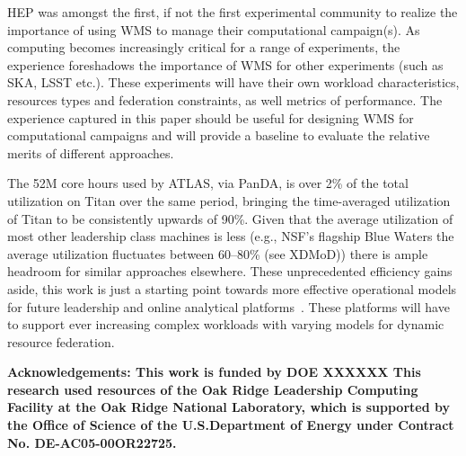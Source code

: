 
HEP was amongst the first, if not the first experimental community to realize
the importance of using WMS to manage their computational campaign(s). As
computing becomes increasingly critical for a range of experiments, the
experience foreshadows the importance of WMS for other experiments (such as
SKA, LSST etc.).  These experiments will have their own workload
characteristics, resources types and federation constraints, as well metrics
of performance. The experience captured in this paper should be useful
for designing WMS for computational campaigns and will provide a baseline to
evaluate the relative merits of different approaches.

The 52M core hours used by ATLAS, via PanDA, is over 2\% of the total
utilization on Titan over the same period, bringing the time-averaged
utilization of Titan to be consistently upwards of 90\%. Given that the
average utilization of most other leadership class machines is less (e.g.,
NSF's flagship Blue Waters the average utilization fluctuates between
60--80\% (see XDMoD\cite{bw-sucks})) there is ample headroom for similar
approaches elsewhere. These unprecedented efficiency gains aside, this work
is just a starting point towards more effective operational models for future
leadership and online analytical platforms~\cite{foap-url}. These platforms
will have to support ever increasing complex workloads with varying models
for dynamic resource federation.

{\bf \footnotesize Acknowledgements: This work is funded by DOE XXXXXX This
research used resources of the Oak Ridge Leadership Computing Facility at the
Oak Ridge National Laboratory, which is supported by the Office of Science of
the U.S.Department of Energy under Contract No. DE-AC05-00OR22725. \par}


